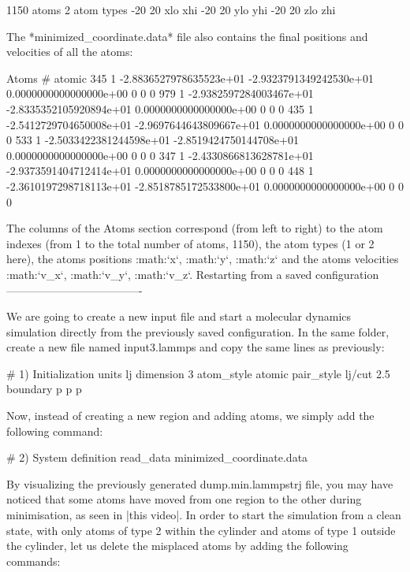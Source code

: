 \begin{lcverbatim}
1150 atoms
2 atom types
-20 20 xlo xhi
-20 20 ylo yhi
-20 20 zlo zhi
\end{lcverbatim}

The *minimized_coordinate.data* file also contains the final
positions and velocities of all the atoms:

\begin{lcverbatim}
Atoms # atomic
345 1 -2.8836527978635523e+01 -2.9323791349242530e+01 0.0000000000000000e+00 0 0 0
979 1 -2.9382597284003467e+01 -2.8335352105920894e+01 0.0000000000000000e+00 0 0 0
435 1 -2.5412729704650008e+01 -2.9697644643809667e+01 0.0000000000000000e+00 0 0 0
533 1 -2.5033422381244598e+01 -2.8519424750144708e+01 0.0000000000000000e+00 0 0 0
347 1 -2.4330866813628781e+01 -2.9373591404712414e+01 0.0000000000000000e+00 0 0 0
448 1 -2.3610197298718113e+01 -2.8518785172533800e+01 0.0000000000000000e+00 0 0 0
\end{lcverbatim}

The columns of the Atoms section
correspond (from left to right) to the atom indexes (from 1
to the total number of atoms, 1150), the atom types (1 or 2
here), the atoms positions :math:`x`, :math:`y`, :math:`z` and the
atoms velocities :math:`v_x`, :math:`v_y`, :math:`v_z`.
Restarting from a saved configuration
-------------------------------------

We are going to create a new input file and start a
molecular dynamics simulation directly from the previously
saved configuration. In the same folder, create a new file
named input3.lammps and copy the same lines as previously:

\begin{lcverbatim}
# 1) Initialization
units lj
dimension 3
atom_style atomic
pair_style lj/cut 2.5
boundary p p p
\end{lcverbatim}

Now, instead of creating a new region and adding atoms, we
simply add the following command:

\begin{lcverbatim}
# 2) System definition
read_data minimized_coordinate.data
\end{lcverbatim}

By visualizing the previously generated dump.min.lammpstrj
file, you may have noticed that some atoms have moved from
one region to the other during minimisation, as seen in
|this video|.
In order to start the simulation from a clean state, with
only atoms of type 2 within the cylinder and atoms of type
1 outside the cylinder, let us delete the misplaced atoms
by adding the following commands:

